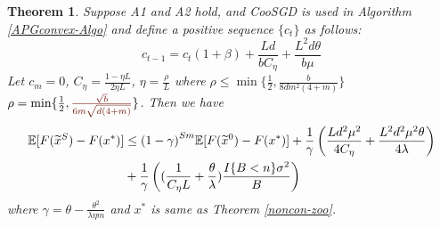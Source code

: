 \documentclass{article}
\newcommand*{\E}{\mathbb{E}}
\newtheorem{theorem}{Theorem}[section]
\theoremstyle{definition}
\theoremstyle{remark}
\begin{document}
\begin{theorem}\label{SC-theo}
Suppose  A1  and  A2  hold, and  CooSGD  is  used  in  Algorithm \ref{APGconvex-Algo} and define a positive sequence $\{c_t\}$ as follows:
\[
c_{t-1} = c_{t}(1+{\beta})+\frac{Ld}{bC_{\eta}}+\frac{L^2d\theta}{b\mu}
\]
Let $c_m = 0$, $C_{\eta} = \frac{1-\eta L}{2\eta L}$, $\eta = \frac{\rho}{L}$ where $\rho\leq \min\{\frac{1}{2},\frac{b}{8dm^2(4+m)}\}$ $\rho = \min\{\frac{1}{2},{\color{Brown}\frac{\sqrt{b}}{6m\sqrt{d(4+m)}}}\}$. Then we have
\begin{align}\label{main-eq-SC}
\E[F(\widetilde{x}^S) - F(x^*)] & \leq {(1-\gamma)}^{Sm} \E[F(\widetilde{x}^0) - F(x^*)]+\frac{1}{{\gamma}}\left(\frac{Ld^2\mu^2}{4C_{\eta}}+\frac{ L^2d^2\mu^2\theta}{4\lambda}\right)\notag\\
&+ \frac{1}{\gamma}\left((\frac{1}{C_{\eta} L}+\frac{\theta}{\lambda})\frac{I\{B < n\} \sigma ^2}{B}\right)
\end{align}
where $\gamma  = \theta - \frac{ \theta^2}{\lambda\eta m}$ and $x^*$ is same as Theorem \ref{noncon-zoo}.

\end{theorem}
\end{document}
